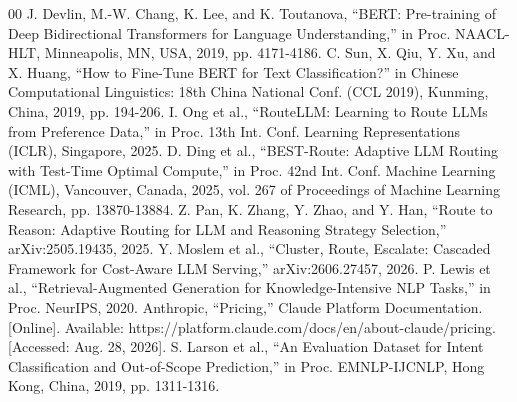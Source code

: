 \documentclass[conference]{IEEEtran}
\begin{document}
\begin{thebibliography}{00}
 J. Devlin, M.-W. Chang, K. Lee, and K. Toutanova, ``BERT: Pre-training of Deep Bidirectional Transformers for Language Understanding,'' in Proc. NAACL-HLT, Minneapolis, MN, USA, 2019, pp. 4171-4186.
 C. Sun, X. Qiu, Y. Xu, and X. Huang, ``How to Fine-Tune BERT for Text Classification?'' in Chinese Computational Linguistics: 18th China National Conf. (CCL 2019), Kunming, China, 2019, pp. 194-206.
 I. Ong et al., ``RouteLLM: Learning to Route LLMs from Preference Data,'' in Proc. 13th Int. Conf. Learning Representations (ICLR), Singapore, 2025.
 D. Ding et al., ``BEST-Route: Adaptive LLM Routing with Test-Time Optimal Compute,'' in Proc. 42nd Int. Conf. Machine Learning (ICML), Vancouver, Canada, 2025, vol. 267 of Proceedings of Machine Learning Research, pp. 13870-13884.
 Z. Pan, K. Zhang, Y. Zhao, and Y. Han, ``Route to Reason: Adaptive Routing for LLM and Reasoning Strategy Selection,'' arXiv:2505.19435, 2025.
 Y. Moslem et al., ``Cluster, Route, Escalate: Cascaded Framework for Cost-Aware LLM Serving,'' arXiv:2606.27457, 2026.
 P. Lewis et al., ``Retrieval-Augmented Generation for Knowledge-Intensive NLP Tasks,'' in Proc. NeurIPS, 2020.
 Anthropic, ``Pricing,'' Claude Platform Documentation. [Online]. Available: https://platform.claude.com/docs/en/about-claude/pricing. [Accessed: Aug. 28, 2026].
 S. Larson et al., ``An Evaluation Dataset for Intent Classification and Out-of-Scope Prediction,'' in Proc. EMNLP-IJCNLP, Hong Kong, China, 2019, pp. 1311-1316.
\end{thebibliography}
\end{document}
